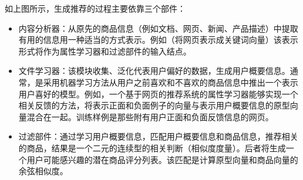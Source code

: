 如上图所示，生成推荐的过程主要依靠三个部件：
\begin{itemize}
	\item 内容分析器：从原先的商品信息（例如文档、网页、新闻、产品描述）中提取有用的信息用一种适当的方式表示。例如（将网页表示成关键词向量）该表示形式将作为属性学习器和过滤部件的输入结点。
	\item 文件学习器：该模块收集、泛化代表用户偏好的数据，生成用户概要信息。通常，是采用机器学习方法从用户之前喜欢和不喜欢的商品信息中推出一个表示用户喜好的模型。例如，一个基于网页的推荐系统的属性学习器能够实现一个相关反馈的方法，将表示正面和负面例子的向量与表示用户概要信息的原型向量混合在一起。训练样例是那些附有用户正面和负面反馈信息的网页。
	\item  过滤部件：通过学习用户概要信息，匹配用户概要信息和商品信息，推荐相关的商品，结果是一个二元的连续型的相关判断（相似度度量）。后者将生成一个用户可能感兴趣的潜在商品评分列表。该匹配是计算原型向量和商品向量的余弦相似度。
\end{itemize} 


